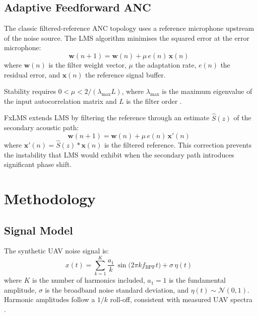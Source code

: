 \documentclass[journal,12pt,onecolumn]{IEEEtran}
\begin{document}
\subsection{Adaptive Feedforward ANC}

The classic filtered-reference ANC topology \cite{kuo1999} uses a
reference microphone upstream of the noise source.
The LMS algorithm minimises the squared error at the error microphone:
\begin{equation}
  \bm{w}(n+1) = \bm{w}(n) + \mu\,e(n)\,\bm{x}(n)
  \label{eq:lms}
\end{equation}
where $\bm{w}(n)$ is the filter weight vector, $\mu$ the adaptation rate,
$e(n)$ the residual error, and $\bm{x}(n)$ the reference signal buffer.

Stability requires $0 < \mu < 2/(\lambda_{\max} L)$, where $\lambda_{\max}$
is the maximum eigenvalue of the input autocorrelation matrix and $L$ is
the filter order \cite{widrow1985}.

FxLMS \cite{kuo1996} extends LMS by filtering the reference through an
estimate $\hat{S}(z)$ of the secondary acoustic path:
\begin{equation}
  \bm{w}(n+1) = \bm{w}(n) + \mu\,e(n)\,\bm{x}'(n)
  \label{eq:fxlms}
\end{equation}
where $\bm{x}'(n) = \hat{S}(z) * \bm{x}(n)$ is the filtered reference.
This correction prevents the instability that LMS would exhibit when the
secondary path introduces significant phase shift.

\section{Methodology}
\label{sec:methodology}

\subsection{Signal Model}

The synthetic UAV noise signal is:
\begin{equation}
  x(t) = \sum_{k=1}^{K} \frac{a_1}{k}\,\sin\!\bigl(2\pi k f_{\text{BPF}} t\bigr)
         + \sigma\,\eta(t)
  \label{eq:signal}
\end{equation}
where $K$ is the number of harmonics included, $a_1=1$ is the fundamental
amplitude, $\sigma$ is the broadband noise standard deviation, and
$\eta(t)\sim\mathcal{N}(0,1)$.
Harmonic amplitudes follow a $1/k$ roll-off, consistent with measured UAV
spectra \cite{torija2022}.
\end{document}
